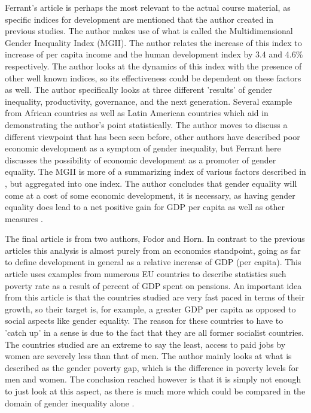 \documentclass[12pt, letterpaper]{article}
\begin{document}
Ferrant's article is perhaps the most relevant to the actual course material, as specific indices for development are mentioned that the author created in previous studies. The author makes use of what is called the Multidimensional Gender Inequality Index (MGII). The author relates the increase of this index to increase of per capita income and the human development index by 3.4 and 4.6\% respectively. The author looks at the dynamics of this index with the presence of other well known indices, so its effectiveness could be dependent on these factors as well. The author specifically looks at three different 'results' of gender inequality, productivity, governance, and the next generation. Several example from African countries as well as Latin American countries which aid in demonstrating the author's point statistically. The author moves to discuss a different viewpoint that has been seen before, other authors have described poor economic development as a symptom of gender inequality, but Ferrant here discusses the possibility of economic development as a promoter of gender equality. The MGII is more of a summarizing index of various factors described in \cite{bhatt}, but aggregated into one index. The author concludes that gender equality will come at a cost of some economic development, it is necessary, as having gender equality does lead to a net positive gain for GDP per capita as well as other measures \cite{ferrant}.

The final article is from two authors, Fodor and Horn. In contrast to the previous articles this analysis is almost purely from an economics standpoint, going as far to define development in general as a relative increase of GDP (per capita). This article uses examples from numerous EU countries to describe statistics such poverty rate as a result of percent of GDP spent on pensions. An important idea from this article is that the countries studied are very fast paced in terms of their growth, so their target is, for example, a greater GDP per capita as opposed to social aspects like gender equality. The reason for these countries to have to 'catch up' in a sense is due to the fact that they are all former socialist countries. The countries studied are an extreme to say the least, access to paid jobs by women are severely less than that of men. The author mainly looks at what is described as the gender poverty gap, which is the difference in poverty levels for men and women. The conclusion reached however is that it is simply not enough to just look at this aspect, as there is much more which could be compared in the domain of gender inequality alone \cite{foho}. 
\end{document}
